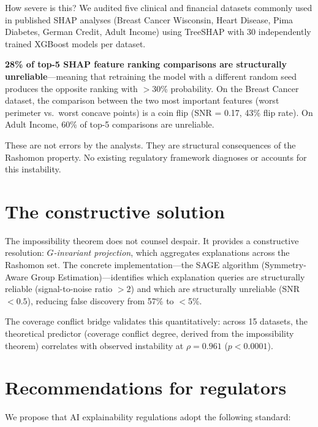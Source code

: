 \documentclass[11pt]{article}
\begin{document}
How severe is this?  We audited five clinical and financial datasets commonly
used in published SHAP analyses (Breast Cancer Wisconsin, Heart Disease,
Pima Diabetes, German Credit, Adult Income) using TreeSHAP with 30
independently trained XGBoost models per dataset.

\textbf{28\% of top-5 SHAP feature ranking comparisons are structurally
unreliable}---meaning that retraining the model with a different random seed
produces the opposite ranking with $>$30\% probability.  On the Breast
Cancer dataset, the comparison between the two most important features
(worst perimeter vs.\ worst concave points) is a coin flip (SNR = 0.17,
43\% flip rate).  On Adult Income, 60\% of top-5 comparisons are unreliable.

These are not errors by the analysts.  They are structural consequences of
the Rashomon property.  No existing regulatory framework diagnoses or
accounts for this instability.

\section*{The constructive solution}

The impossibility theorem does not counsel despair.  It provides a
constructive resolution: \emph{$G$-invariant projection}, which aggregates
explanations across the Rashomon set.  The concrete implementation---the
SAGE algorithm (Symmetry-Aware Group Estimation)---identifies which
explanation queries are structurally reliable (signal-to-noise ratio $> 2$)
and which are structurally unreliable (SNR $< 0.5$), reducing false
discovery from 57\% to $<$5\%.

The coverage conflict bridge validates this quantitatively: across 15
datasets, the theoretical predictor (coverage conflict degree, derived from
the impossibility theorem) correlates with observed instability at
$\rho = 0.961$ ($p < 0.0001$).

\section*{Recommendations for regulators}

We propose that AI explainability regulations adopt the following standard:
\end{document}
